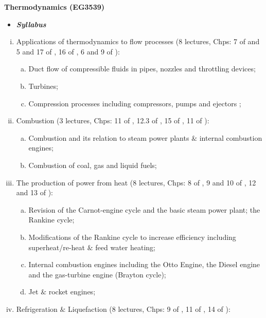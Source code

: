 \documentclass[11pt,oneside,a4paper]{article}
\begin{document}
\setcounter{page}{1}

\begin{center}
{\bf {\Large Thermodynamics (EG3539)}}
\end{center}


\begin{itemize}
\item {\it {\bf {\large Syllabus}}}
\end{itemize}

\begin{enumerate}[(i)]
%
\item Applications of thermodynamics to flow processes (8 lectures, Chps: 7 of \cite{smith_2001} and 5 and 17 of \cite{cengel_2010}, 16 of \cite{rajput_2007}, 6 and 9 of \cite{powers_2012}): 
\begin{enumerate}[(a)]
\item Duct flow of compressible fluids in pipes, nozzles and throttling devices; 
\item Turbines; 
\item Compression processes including compressors, pumps and ejectors ;
\end{enumerate}
%
\item Combustion (3 lectures, Chps: 11 of \cite{devoe_2012}, 12.3 of \cite{muller_2009}, 15 of \cite{cengel_2010}, 11 of \cite{rajput_2007}):
\begin{enumerate}[(a)]
\item Combustion and its relation to steam power plants $\&$ internal combustion engines; 
\item Combustion of coal, gas and liquid fuels;
\end{enumerate}
%
\item The production of power from heat (8 lectures, Chps: 8 of \cite{smith_2001}, 9 and 10 of \cite{cengel_2010}, 12 and 13 of \cite{rajput_2007}): 
\begin{enumerate}[(a)]
\item Revision of the Carnot-engine cycle and the basic steam power plant; the Rankine cycle; 
\item Modifications of the Rankine cycle to increase efficiency including superheat/re-heat $\&$ feed water heating; 
\item Internal combustion engines including the Otto Engine, the Diesel engine and the gas-turbine engine (Brayton cycle); 
\item Jet $\&$ rocket engines;
\end{enumerate}
%
\item Refrigeration $\&$ Liquefaction (8 lectures, Chps: 9 of \cite{smith_2001}, 11 of \cite{cengel_2010}, 14 of \cite{rajput_2007}):

\end{enumerate}
\end{document}
